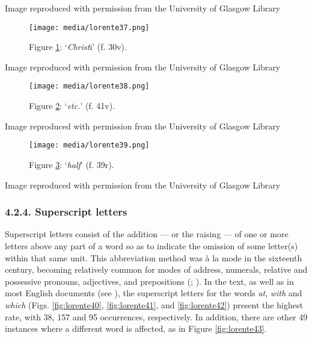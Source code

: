 \documentclass{article}
\begin{document}
 Image reproduced with permission from the University of Glasgow Library 


 
  \begin{figure}
    \texttt{[image: media/lorente37.png]}
    \caption{Figure \ref{fig:lorente37}: `\emph{Christ}i' (f. 30v).\\}
    \label{fig:lorente37}
  \end{figure}


 Image reproduced with permission from the University of Glasgow Library 


 
  \begin{figure}
    \texttt{[image: media/lorente38.png]}
    \caption{Figure \ref{fig:lorente38}: `\emph{etc.}' (f. 41v).}
    \label{fig:lorente38}
  \end{figure}


 Image reproduced with permission from the University of Glasgow Library 


 
  \begin{figure}
  \texttt{[image: media/lorente39.png]}
    \caption{Figure \ref{fig:lorente39}: `\emph{half}' (f. 39r).}
    \label{fig:lorente39}
\end{figure}


 Image reproduced with permission from the University of Glasgow Library 


 
\subsubsection{4.2.4. Superscript letters}

Superscript letters consist of the addition –– or the raising –– of one
or more letters above any part of a word so as to indicate
the omission of some letter(s) within that same unit. This abbreviation
method was à la mode in the sixteenth century, becoming relatively
common for modes of address, numerals, relative and possessive pronouns,
adjectives, and prepositions (\cite[134]{tannenbaum_handwriting_1930}; \cite[24]{petti_english_1977}). In
the text, as well as in most English documents (see \cite[119]{calle-martin_corpus-based_2021}), the superscript letters for the words \emph{\th}\emph{at}, \emph{with} and
\emph{which} (Figs. \ref{fig:lorente40}, \ref{fig:lorente41}, and \ref{fig:lorente42}) present the highest rate, with 38,
157 and 95 occurrences, respectively. In addition, there are other 49
instances where a different word is affected, as in Figure \ref{fig:lorente43}.
\end{document}
